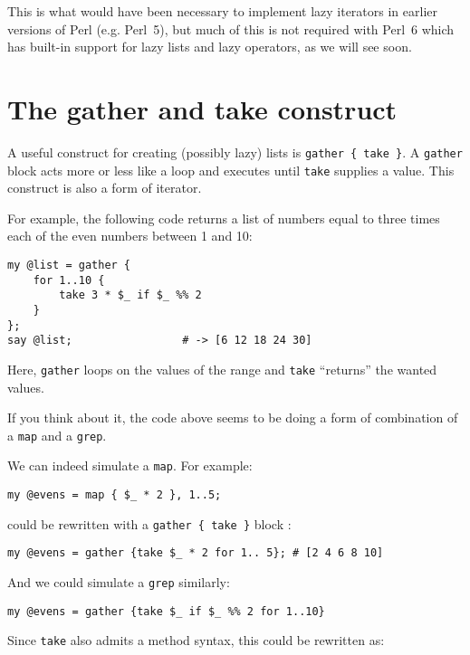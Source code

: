 This is what would have been necessary to implement lazy 
iterators in earlier versions of Perl (e.g. Perl~5), but 
much of this is not required with Perl~6 which has built-in 
support for lazy lists and lazy operators, as we will see soon.

\section{The gather and take construct}

A useful construct for creating (possibly lazy) lists 
is  \verb'gather { take }'. A \verb'gather' block 
acts more or less like a loop and executes until 
\verb'take' supplies a value. This construct is also 
a form of iterator.

For example, the following code returns a list of 
numbers equal to three times each of the even numbers 
between 1 and 10:

\begin{verbatim}
my @list = gather { 
    for 1..10 {
        take 3 * $_ if $_ %% 2
    } 
};
say @list;                 # -> [6 12 18 24 30]
\end{verbatim}

Here, \verb'gather' loops on the values of the range 
and {\tt take} ``returns'' the wanted values.

If you think about it, the code above seems to 
be doing a form of combination of a {\tt map} and a 
{\tt grep}.

We can indeed simulate a \verb'map'. For example:

\begin{verbatim}
my @evens = map { $_ * 2 }, 1..5;
\end{verbatim}

could be rewritten with a \verb'gather { take }' 
block :

\begin{verbatim}
my @evens = gather {take $_ * 2 for 1.. 5}; # [2 4 6 8 10]
\end{verbatim}

And we could simulate a {\tt grep} similarly:

\begin{verbatim}
my @evens = gather {take $_ if $_ %% 2 for 1..10}
\end{verbatim}

Since {\tt take} also admits a method syntax, this could 
be rewritten as:

